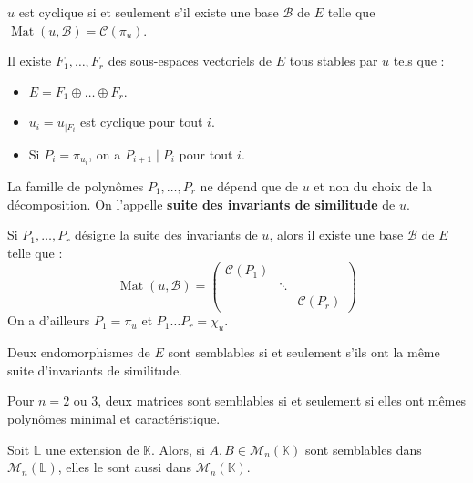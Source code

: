  \begin{proposition}
    $u$ est cyclique si et seulement s'il existe une base $\mathcal{B}$ de $E$ telle que $\operatorname{Mat}(u, \mathcal{B}) = \mathcal{C}(\pi_u)$.
  \end{proposition}

  \begin{theorem}
    Il existe $F_1, \dots, F_r$ des sous-espaces vectoriels de $E$ tous stables par $u$ tels que :
    \begin{itemize}
      \item $E = F_1 \oplus \dots \oplus F_r$.
      \item $u_i = u_{|F_i}$ est cyclique pour tout $i$.
      \item Si $P_i = \pi_{u_i}$, on a $P_{i+1} \mid P_i$ pour tout $i$.
    \end{itemize}
    La famille de polynômes $P_1, \dots, P_r$ ne dépend que de $u$ et non du choix de la décomposition. On l'appelle \textbf{suite des invariants de similitude} de $u$.
  \end{theorem}

  \begin{theorem}
    Si $P_1, \dots, P_r$ désigne la suite des invariants de $u$, alors il existe une base $\mathcal{B}$ de $E$ telle que :
    \[ \operatorname{Mat}(u, \mathcal{B}) = \begin{pmatrix} \mathcal{C}(P_1) & & \\ & \ddots & \\ & & \mathcal{C}(P_r) \end{pmatrix} \]
    On a d'ailleurs $P_1 = \pi_u$ et $P_1 \dots P_r = \chi_u$.
  \end{theorem}

  \begin{corollary}
    Deux endomorphismes de $E$ sont semblables si et seulement s'ils ont la même suite d'invariants de similitude.
  \end{corollary}

  \begin{application}
    Pour $n = 2$ ou $3$, deux matrices sont semblables si et seulement si elles ont mêmes polynômes minimal et caractéristique.
  \end{application}

  \begin{application}
    Soit $\mathbb{L}$ une extension de $\mathbb{K}$. Alors, si $A, B \in \mathcal{M}_n(\mathbb{K})$ sont semblables dans $\mathcal{M}_n(\mathbb{L})$, elles le sont aussi dans $\mathcal{M}_n(\mathbb{K})$.
  \end{application}

